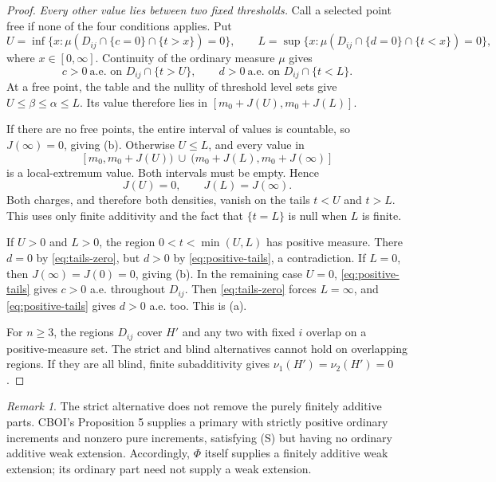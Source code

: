 \documentclass[11pt]{article}
\theoremstyle{remark}\newtheorem{remark}[theorem]{Remark}
\begin{document}
\begin{proof}
\emph{Every other value lies between two fixed thresholds.}
Call a selected point free if none of the four conditions applies. Put
\[
 U=\inf\{x:\mu(D_{ij}\cap\{c=0\}\cap\{t>x\})=0\},
 \qquad
 L=\sup\{x:\mu(D_{ij}\cap\{d=0\}\cap\{t<x\})=0\},
\]
where $x\in[0,\infty]$. Continuity of the ordinary measure $\mu$ gives
\begin{equation}
 c>0\ \text{a.e. on }D_{ij}\cap\{t>U\},\qquad
 d>0\ \text{a.e. on }D_{ij}\cap\{t<L\}.
 \label{eq:positive-tails}
\end{equation}
At a free point, the table and the nullity of threshold level sets give
$U\le\beta\le\alpha\le L$. Its value therefore lies in
$[m_0+J(U),m_0+J(L)]$.

If there are no free points, the entire interval of values is countable,
so $J(\infty)=0$, giving (b). Otherwise $U\le L$, and every value in
\[
 [m_0,m_0+J(U))\ \cup\ (m_0+J(L),m_0+J(\infty)]
\]
is a local-extremum value. Both intervals must be empty. Hence
\begin{equation}
 J(U)=0,\qquad J(L)=J(\infty).
 \label{eq:tails-zero}
\end{equation}
Both charges, and therefore both densities, vanish on the tails $t<U$
and $t>L$. This uses only finite additivity and the fact that $\{t=L\}$
is null when $L$ is finite.

If $U>0$ and $L>0$, the region $0<t<\min(U,L)$ has positive measure.
There $d=0$ by \eqref{eq:tails-zero}, but $d>0$ by
\eqref{eq:positive-tails}, a contradiction. If $L=0$, then
$J(\infty)=J(0)=0$, giving (b). In the remaining case $U=0$,
\eqref{eq:positive-tails} gives $c>0$ a.e. throughout $D_{ij}$.
Then \eqref{eq:tails-zero} forces $L=\infty$, and
\eqref{eq:positive-tails} gives $d>0$ a.e. too. This is (a).

For $n\ge3$, the regions $D_{ij}$ cover $H'$ and any two with fixed $i$
overlap on a positive-measure set. The strict and blind alternatives cannot
hold on overlapping regions. If they are all blind, finite subadditivity
gives $\nu_1(H')=\nu_2(H')=0$.
\end{proof}

\begin{remark}
The strict alternative does not remove the purely finitely additive parts.
CBOI's Proposition 5 supplies a primary with strictly positive ordinary
increments and nonzero pure increments, satisfying (S) but having no ordinary
additive weak extension. Accordingly, $\Phi$ itself supplies a finitely
additive weak extension; its ordinary part need not supply a weak extension.
\end{remark}
\end{document}
